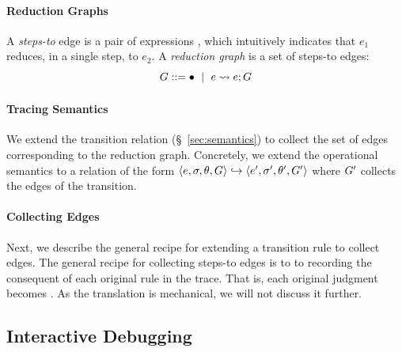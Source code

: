 \paragraph{Reduction Graphs}
%
A \emph{steps-to} edge is a pair of expressions , which
intuitively indicates that $e_1$ reduces, in a single step, to $e_2$.
%
%
A \emph{reduction graph} is a set of steps-to edges:
$$G ::= \bullet \ \mid \  e \leadsto e; G$$  %

\paragraph{Tracing Semantics}
%
We extend the transition relation (\S~\ref{sec:semantics}) to
collect the set of edges corresponding to the reduction graph.
%
Concretely, we extend the operational semantics to
a relation of the form $\langle e, \sigma, \theta, G \rangle \hookrightarrow \langle e', \sigma', \theta', G' \rangle$
where $G'$ collects the edges of the transition.

\paragraph{Collecting Edges}
%
Next, we describe the general recipe for extending a transition
rule to collect edges.
%
The general recipe for collecting steps-to edges is to
to recording the consequent of each original rule in the
trace. That is, each original judgment 
becomes .
%
As the translation is mechanical, we will not discuss it further.



\subsection{Interactive Debugging}
\label{sec:traversing-graph}

